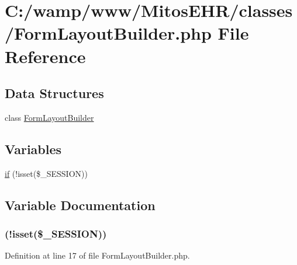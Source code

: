 \hypertarget{_form_layout_builder_8php}{\section{\-C\-:/wamp/www/\-Mitos\-E\-H\-R/classes/\-Form\-Layout\-Builder.php \-File \-Reference}
\label{_form_layout_builder_8php}
}
\subsection*{\-Data \-Structures}
\begin{DoxyCompactItemize}
\item 
class \hyperlink{class_form_layout_builder}{\-Form\-Layout\-Builder}
\end{DoxyCompactItemize}
\subsection*{\-Variables}
\begin{DoxyCompactItemize}
\item 
\hyperlink{_form_layout_builder_8php_a8ceca98aa29914fd2479a84a8d2242fb}{if} (!isset(\$\-\_\-\-S\-E\-S\-S\-I\-O\-N))
\end{DoxyCompactItemize}


\subsection{\-Variable \-Documentation}
\hypertarget{_form_layout_builder_8php_a8ceca98aa29914fd2479a84a8d2242fb}{
\subsubsection[{if}]{(!isset(\$\-\_\-\-S\-E\-S\-S\-I\-O\-N))}}\label{_form_layout_builder_8php_a8ceca98aa29914fd2479a84a8d2242fb}


\-Definition at line 17 of file \-Form\-Layout\-Builder.\-php.

